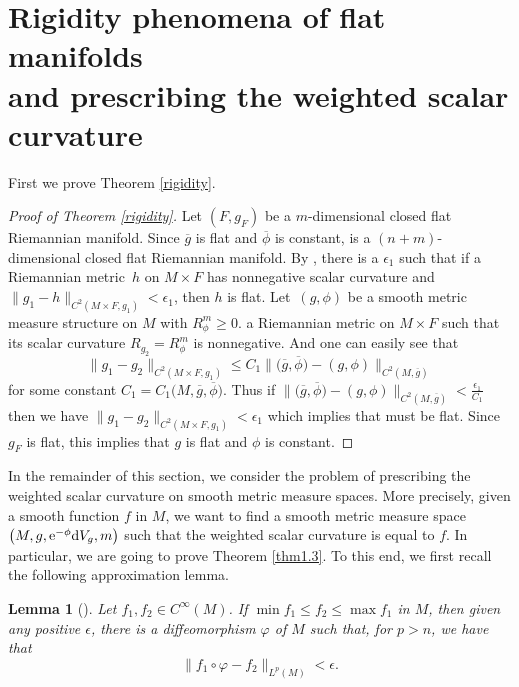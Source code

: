 \documentclass[10pt,a4paper]{amsart}
\numberwithin{equation}{section}
\newtheorem{Lemma}[Theorem]{Lemma}
\begin{document}
\section[Rigidity phenomena of flat manifolds and prescribing the weighted scalar curvature]{Rigidity phenomena of flat manifolds\\ and prescribing the weighted scalar curvature}\label{sec5}

First we prove Theorem \ref{rigidity}.

\begin{proof}[Proof of Theorem \ref{rigidity}]
 Let $(F,g_F)$ be a $m$-dimensional closed flat Riemannian manifold. Since $\overline{g}$ is flat and $\overline{\phi}$ is constant,
  is a $(n+m)$-dimensional closed flat Riemannian manifold. By \cite[Theorem~B]{Fischer&Marsden}, there is a $\epsilon_1$ such that if a Riemannian metric~$h$ on $M\times F$ has nonnegative scalar curvature and $\|g_1-h\|_{C^2(M\times F,g_1)}<\epsilon_1$, then $h$ is flat. Let~$(g,\phi)$ be a smooth metric measure structure on $M$ with $R_\phi^m\geq0$.  a Riemannian metric on $M\times F$ such that its scalar curvature $R_{g_2}=R_{\phi}^m$ is nonnegative. And one can easily see that
 \begin{equation*}
 \|g_1-g_2\|_{C^2(M\times F,g_1)}\leq C_1\bigl\|\bigl(\overline{g},\overline{\phi}\bigr)-(g,\phi)\bigr\|_{C^2(M,\overline{g})}
 \end{equation*}
 for some constant $C_1=C_1\bigl(M,\overline{g},\overline{\phi}\bigr)$. Thus if $\bigl\|\bigl(\overline{g},\overline{\phi}\bigr)-(g,\phi)\bigr\|_{C^2(M,\overline{g})}<\frac{\epsilon_1}{C_1}$ then we have $\|g_1-g_2\|_{C^2(M\times F,g_1)}<\epsilon_1$ which implies that  must be flat. Since $g_F$ is flat, this implies that $g$ is flat and $\phi$ is constant.
\end{proof}

In the remainder of this section, we consider the problem of prescribing the weighted scalar curvature on smooth metric measure spaces.
More precisely, given a smooth function $f$ in $M$,
we want to find a smooth metric measure space $\bigl(M, g, {\rm e}^{-\phi}{\rm d}V_g, m\bigr)$ such that the weighted scalar curvature is equal to $f$.
In particular, we are going to prove Theorem \ref{thm1.3}.
To this end, we first recall the following approximation lemma.

\begin{Lemma}[{\cite[Theorem 2.1]{Kazdan&Warner2}}]\label{approxlem}
 Let $f_1, f_2\in C^\infty(M)$. If $\min f_1\leq f_2\leq \max f_1$ in $M$, then given any positive $\epsilon$, there is a diffeomorphism $\varphi$ of $M$ such that, for $p>n$, we have that
\begin{equation*}
 \|f_1\circ\varphi-f_2\|_{L^p(M)}<\epsilon.
\end{equation*}
\end{Lemma}
\end{document}
